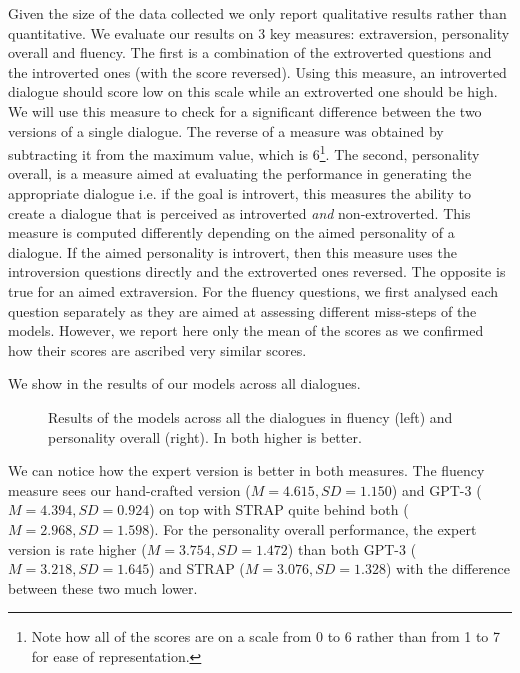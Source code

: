 \documentclass[nomenclature, english, biblatex]{kththesis}
\begin{document}
Given the size of the data collected we only report qualitative results rather than quantitative. We evaluate our results on 3 key measures: extraversion, personality overall and fluency. The first is a combination of the extroverted questions and the introverted ones (with the score reversed). Using this measure, an introverted dialogue should score low on this scale while an extroverted one should be high. We will use this measure to check for a significant difference between the two versions of a single dialogue. The reverse of a measure was obtained by subtracting it from the maximum value, which is 6\footnote{Note how all of the scores are on a scale from 0 to 6 rather than from 1 to 7 for ease of representation.}. The second, personality overall, is a measure aimed at evaluating the performance in generating the appropriate dialogue i.e. if the goal is introvert, this measures the ability to create a dialogue that is perceived as introverted \textit{and} non-extroverted. This measure is computed differently depending on the aimed personality of a dialogue. If the aimed personality is introvert, then this measure uses the introversion questions directly and the extroverted ones reversed. The opposite is true for an aimed extraversion. For the fluency questions, we first analysed each question separately as they are aimed at assessing different miss-steps of the models. However, we report here only the mean of the scores as we confirmed how their scores are ascribed very similar scores. 

We show in  the results of our models across all dialogues.

\begin{figure}[ht]
    \centering
    \begin{adjustbox}{max width=\textwidth}
        \begin{adjustbox}{max width=0.5\textwidth}
            
        \end{adjustbox}   
        \begin{adjustbox}{max width=0.5\textwidth}
            
        \end{adjustbox}
    \end{adjustbox}
    \caption{Results of the models across all the dialogues in fluency (left) and personality overall (right). In both higher is better.}
    \label{fig:pilot_overall}
\end{figure}
We can notice how the expert version is better in both measures. The fluency measure sees our hand-crafted version ($M=4.615, SD=1.150$) and GPT-3 ($M=4.394, SD=0.924$) on top with STRAP quite behind both ($M=2.968, SD=1.598$). For the personality overall performance, the expert version is rate higher ($M=3.754, SD=1.472$) than both GPT-3 ($M=3.218, SD=1.645$) and STRAP ($M=3.076, SD=1.328$) with the difference between these two much lower.
\end{document}
